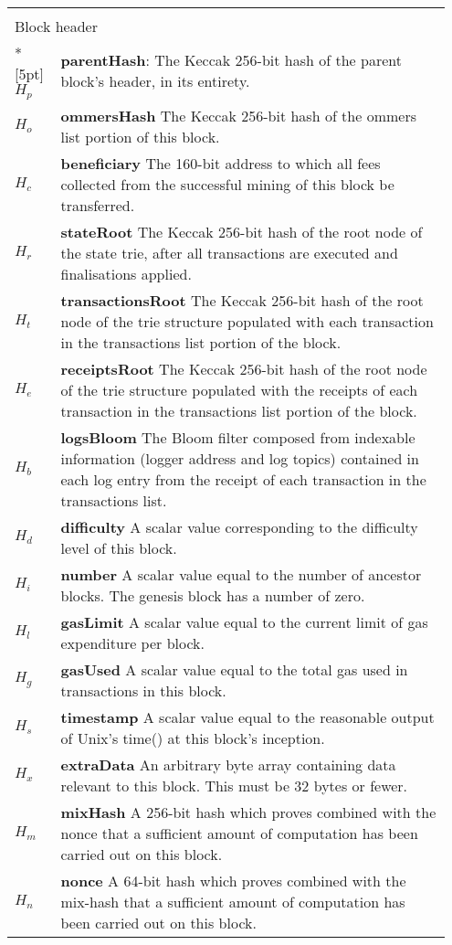 \documentclass[9pt,oneside]{amsart}
\begin{document}
\begin{longtable}{p{0.10\linewidth}p{0.85\linewidth}}
\vspace{5pt} \\
\multicolumn{2}{l}{Block header} \\*[5pt]
$H_p$ & \textbf{parentHash}: The Keccak 256-bit hash of the parent block's header, in its entirety. \\
$H_o$ & \textbf{ommersHash} The Keccak 256-bit hash of the ommers list portion of this block. \\
$H_c$ & \textbf{beneficiary} The 160-bit address to which all fees collected from the successful mining of this block be transferred. \\
$H_r$ & \textbf{stateRoot} The Keccak 256-bit hash of the root node of the state trie, after all transactions are executed and finalisations applied. \\
$H_t$ & \textbf{transactionsRoot} The Keccak 256-bit hash of the root node of the trie structure populated with each transaction in the transactions list portion of the block. \\
$H_e$ & \textbf{receiptsRoot} The Keccak 256-bit hash of the root node of the trie structure populated with the receipts of each transaction in the transactions list portion of the block. \\
$H_b$ & \textbf{logsBloom} The Bloom filter composed from indexable information (logger address and log topics) contained in each log entry from the receipt of each transaction in the transactions list. \\
$H_d$ & \textbf{difficulty} A scalar value corresponding to the difficulty level of this block. \\
$H_i$ & \textbf{number} A scalar value equal to the number of ancestor blocks. The genesis block has a number of zero. \\
$H_l$ & \textbf{gasLimit} A scalar value equal to the current limit of gas expenditure per block. \\
$H_g$ & \textbf{gasUsed} A scalar value equal to the total gas used in transactions in this block. \\
$H_s$ & \textbf{timestamp} A scalar value equal to the reasonable output of Unix's time() at this block's inception. \\
$H_x$ & \textbf{extraData} An arbitrary byte array containing data relevant to this block. This must be 32 bytes or fewer. \\
$H_m$ & \textbf{mixHash} A 256-bit hash which proves combined with the nonce that a sufficient amount of computation has been carried out on this block. \\
$H_n$ & \textbf{nonce} A 64-bit hash which proves combined with the mix-hash that a sufficient amount of computation has been carried out on this block. \\


\end{longtable}
\end{document}
